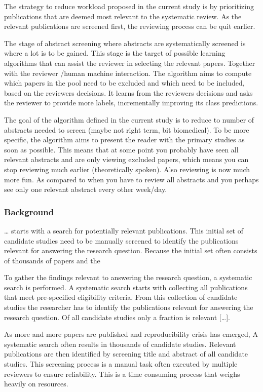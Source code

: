 \documentclass[
]{article}
\begin{document}
The strategy to reduce workload proposed in the current study is by
prioritizing publications that are deemed most relevant to the
systematic review. As the relevant publications are screened first, the
reviewing process can be quit earlier.

The stage of abstract screening where abstracts are systematically
screened is where a lot is to be gained. This stage is the target of
possible learning algorithms that can assist the reviewer in selecting
the relevant papers. Together with the reviewer /human machine
interaction. The algorithm aims to compute which papers in the pool need
to be excluded and which need to be included, based on the reviewers
decisions. It learns from the reviewers decisions and asks the reviewer
to provide more labels, incrementally improving its class predictions.

The goal of the algorithm defined in the current study is to reduce to
number of abstracts needed to screen (maybe not right term, bit
biomedical). To be more specific, the algorithm aims to present the
reader with the primary studies as soon as possible. This means that at
some point you probably have seen all relevant abstracts and are only
viewing excluded papers, which means you can stop reviewing much earlier
(theoretically spoken). Also reviewing is now much more fun. As compared
to when you have to review all abstracts and you perhaps see only one
relevant abstract every other week/day.

\hypertarget{background-1}{%
\subsubsection{Background}\label{background-1}}

\ldots{} starts with a search for potentially relevant publications.
This initial set of candidate studies need to be manually screened to
identify the publications relevant for answering the research question.
Because the initial set often consists of thousands of papers and the

To gather the findings relevant to answering the research question, a
systematic search is performed. A systematic search starts with
collecting all publications that meet pre-specified eligibility
criteria. From this collection of candidate studies the researcher has
to identify the publications relevant for answering the research
question. Of all candidate studies only a fraction is relevant
{[}\ldots{]}.

As more and more papers are published and reproducibility crisis has
emerged, A systematic search often results in thousands of candidate
studies. Relevant publications are then identified by screening title
and abstract of all candidate studies. This screening process is a
manual task often executed by multiple reviewers to ensure reliability.
This is a time consuming process that weighs heavily on resources.
\end{document}
